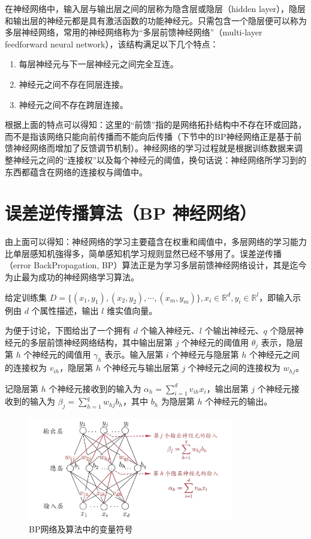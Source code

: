 \documentclass[12pt, a4paper]{article} %
\begin{document}
在神经网络中，输入层与输出层之间的层称为隐含层或隐层（hidden layer），隐层和输出层的神经元都是具有激活函数的功能神经元。只需包含一个隐层便可以称为多层神经网络，常用的神经网络称为“多层前馈神经网络”（multi-layer feedforward neural network），该结构满足以下几个特点：

\begin{enumerate}[\hspace*{2em} i.]
    \item 每层神经元与下一层神经元之间完全互连。
    \item 神经元之间不存在同层连接。
    \item 神经元之间不存在跨层连接。
\end{enumerate}

根据上面的特点可以得知：这里的“前馈”指的是网络拓扑结构中不存在环或回路，而不是指该网络只能向前传播而不能向后传播（下节中的BP神经网络正是基于前馈神经网络而增加了反馈调节机制）。神经网络的学习过程就是根据训练数据来调整神经元之间的“连接权”以及每个神经元的阈值，换句话说：神经网络所学习到的东西都蕴含在网络的连接权与阈值中。

\section{误差逆传播算法（BP 神经网络）}

由上面可以得知：神经网络的学习主要蕴含在权重和阈值中，多层网络的学习能力比单层感知机強得多，简单感知机学习规则显然已经不够用了。误差逆传播（error BackPropagation, BP）算法正是为学习多层前馈神经网络设计，其是迄今为止最为成功的神经网络学习算法。

给定训练集 $D = \{(x_1, y_1), (x_2, y_2), \cdots, (x_m, y_m)\}, x_i \in \mathbb{R}^d, y_i \in \mathbb{R}^l$，即输入示例由 $d$ 个属性描述，输出 $l$ 维实值向量。

为便于讨论，下图给出了一个拥有 $d$ 个输入神经元、$l$ 个输出神经元、$q$ 个隐层神经元的多层前馈神经网络结构，其中输出层第 $j$ 个神经元的阈值用 $\theta_j$ 表示，隐层第 $h$ 个神经元的阈值用 $\gamma_h$ 表示。输入层第 $i$ 个神经元与隐层第 $h$ 个神经元之间的连接权为 $v_{ih}$，隐层第 $h$ 个神经元与输出层第 $j$ 个神经元之间的连接权为 $w_{hj}$。

记隐层第 $h$ 个神经元接收到的输入为 $\displaystyle \alpha_h = \sum_{i = 1}^{d} v_{ih} x_i$，输出层第 $j$ 个神经元接收到的输入为 $\displaystyle \beta_{j} = \sum_{h = 1}^{q} w_{hj}b_h$，其中 $b_h$ 为隐层第 $h$ 个神经元的输出。

\begin{figure}[H]
    \centering
    \includegraphics[width=0.8\textwidth]{../img/5-6-BP网络及算法中的变量符号.png}
    \caption{BP网络及算法中的变量符号}
    \label{fig:BP网络及算法中的变量符号}
\end{figure}
\end{document}
